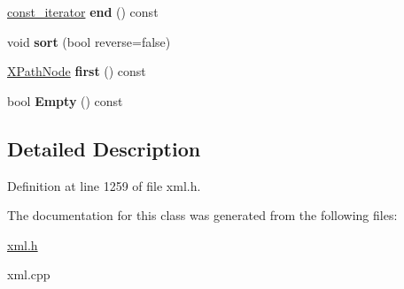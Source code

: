 \begin{DoxyCompactItemize}
\item 
\hypertarget{classphys_1_1xml_1_1XPathNodeSet_adc1ab904e2122928837cc02f1b0a54bf}{
\hyperlink{classphys_1_1xml_1_1XPathNode}{const\_\-iterator} {\bfseries end} () const }
\label{de/dc2/classphys_1_1xml_1_1XPathNodeSet_adc1ab904e2122928837cc02f1b0a54bf}

\item 
\hypertarget{classphys_1_1xml_1_1XPathNodeSet_ad18d6b92f885ee9d862f5008af734559}{
void {\bfseries sort} (bool reverse=false)}
\label{de/dc2/classphys_1_1xml_1_1XPathNodeSet_ad18d6b92f885ee9d862f5008af734559}

\item 
\hypertarget{classphys_1_1xml_1_1XPathNodeSet_a7d3c2d75f154b863a8e81d32e4662b78}{
\hyperlink{classphys_1_1xml_1_1XPathNode}{XPathNode} {\bfseries first} () const }
\label{de/dc2/classphys_1_1xml_1_1XPathNodeSet_a7d3c2d75f154b863a8e81d32e4662b78}

\item 
\hypertarget{classphys_1_1xml_1_1XPathNodeSet_a77e87e2a776cf28501d284532f60e74a}{
bool {\bfseries Empty} () const }
\label{de/dc2/classphys_1_1xml_1_1XPathNodeSet_a77e87e2a776cf28501d284532f60e74a}

\end{DoxyCompactItemize}


\subsection{Detailed Description}


Definition at line 1259 of file xml.h.



The documentation for this class was generated from the following files:\begin{DoxyCompactItemize}
\item 
\hyperlink{xml_8h}{xml.h}\item 
xml.cpp\end{DoxyCompactItemize}
